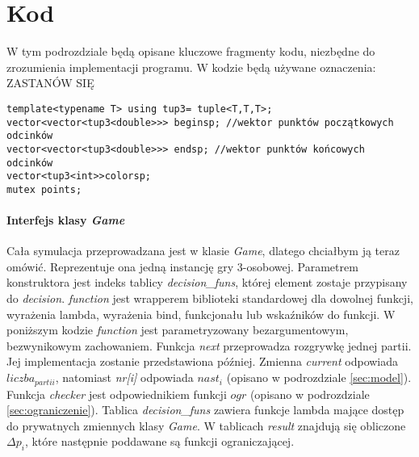 \section{Kod}
\label{sec::kod}
W tym podrozdziale będą opisane kluczowe fragmenty kodu, niezbędne do zrozumienia implementacji programu. W kodzie będą używane oznaczenia:{\color{red} ZASTANÓW SIĘ}
\begin{lstlisting}
template<typename T> using tup3= tuple<T,T,T>;
vector<vector<tup3<double>>> beginsp; //wektor punktów początkowych odcinków
vector<vector<tup3<double>>> endsp; //wektor punktów końcowych odcinków
vector<tup3<int>>colorsp;
mutex points;
\end{lstlisting}

\paragraph{Interfejs klasy \textit{Game}}
Cała symulacja przeprowadzana jest w klasie \textit{Game}, dlatego chciałbym ją teraz omówić. Reprezentuje ona jedną instancję gry 3-osobowej. Parametrem konstruktora jest indeks tablicy \textit{decision\_funs}, której element zostaje przypisany do \textit{decision}. \textit{function} jest wrapperem biblioteki standardowej dla dowolnej funkcji, wyrażenia lambda, wyrażenia bind, funkcjonału lub wskaźników do funkcji. W poniższym kodzie \textit{function} jest parametryzowany bezargumentowym, bezwynikowym zachowaniem. Funkcja \textit{next} przeprowadza rozgrywkę jednej partii. Jej implementacja zostanie przedstawiona później. Zmienna \textit{current} odpowiada $liczba_{partii}$, natomiast \textit{nr[i]} odpowiada $nast_i$ (opisano w podrozdziale \ref{sec:model}). Funkcja \textit{checker} jest odpowiednikiem funkcji $ogr$ (opisano w podrozdziale \ref{sec:ograniczenie}). Tablica \textit{decision\_funs} zawiera funkcje lambda mające dostęp do prywatnych zmiennych klasy \textit{Game}. W tablicach \textit{result} znajdują się obliczone $\Delta p_i$, które następnie poddawane są funkcji ograniczającej. 

